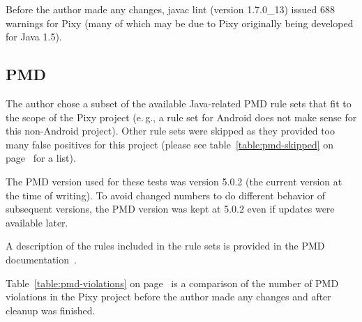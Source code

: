 Before the author made any changes, javac lint (version 1.7.0\_13) issued 688 warnings for Pixy (many of which may be due to Pixy originally being developed for Java 1.5).

\subsection{PMD}

The author chose a subset of the available Java-related PMD rule sets that fit to the scope of the Pixy project (e.\,g., a rule set for Android does not make sense for this non-Android project). Other rule sets were skipped as they provided too many false positives for this project (please see table~\ref{table:pmd-skipped} on page~\pageref{table:pmd-skipped} for a list).

The PMD version used for these tests was version 5.0.2 (the current version at the time of writing). To avoid changed numbers to do different behavior of subsequent versions, the PMD version was kept at 5.0.2 even if updates were available later.

A description of the rules included in the rule sets is provided in the PMD documentation~\cite{pmd-rulesets}.

Table~\ref{table:pmd-violations} on page~\pageref{table:junit-before} is a comparison of the number of PMD violations in the Pixy project before the author made any changes and after cleanup was finished.

